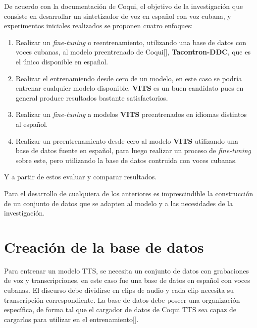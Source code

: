 De acuerdo con la documentación de Coqui, el objetivo de la investigación que consiste en desarrollar un sintetizador de voz en español con voz cubana, y experimentos iniciales realizados se proponen cuatro enfoques:

\begin{enumerate}
	\item Realizar un \textit{fine-tuning} o reentrenamiento, utilizando una base de datos con voces cubanas, al modelo preentrenado de Coqui[\cite{coqui-doc}], \textbf{Tacontron-DDC}, que es el único disponible en español. 
	
	\item Realizar el entrenamiendo desde cero de un modelo, en este caso se podría entrenar cualquier modelo disponible. \textbf{VITS} es un buen candidato pues en general produce resultados bastante satisfactorios.
	
	\item Realizar un \textit{fine-tuning} a modelos \textbf{VITS} preentrenados en idiomas distintos al español.
	
	\item Realizar un preentrenamiento desde cero al modelo \textbf{VITS} utilizando una base de datos fuente en español, para luego realizar un proceso de \textit{fine-tuning} sobre este, pero utilizando la base de datos contruida con voces cubanas.
	
	
	
\end{enumerate}

Y a partir de estos evaluar y comparar resultados.

Para el desarrollo de cualquiera de los anteriores es imprescindible la construcción de un conjunto de datos que se adapten al modelo y a las necesidades de la investigación.


\section{Creación de la base de datos} \label{db}

Para entrenar un modelo TTS, se necesita un conjunto de datos con grabaciones de voz y transcripciones, en este caso fue una base de datos en español con voces cubanas. El discurso debe dividirse en clips de audio y cada clip necesita su transcripción correspondiente. La base de datos debe poseer una organización específica, de forma tal que el cargador de datos de Coqui TTS sea capaz de cargarlos para utilizar en el entrenamiento[\cite{formatting-dataset}].    

